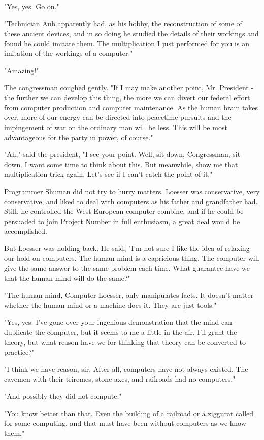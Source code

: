\documentclass{amsart}
\begin{document}
"Yes, yes. Go on."

"Technician Aub apparently had, as his hobby, the reconstruction of
some of these ancient devices, and in so doing he studied the details
of their workings and found he could imitate them. The multiplication
I just performed for you is an imitation of the workings of a
computer."

"Amazing!"

The congressman coughed gently. "If I may make another point, Mr.
President - the further we can develop this thing, the more we can
divert our federal effort from computer production and computer
maintenance. As the human brain takes over, more of our energy can be
directed into peacetime pursuits and the impingement of war on the
ordinary man will be less. This will be most advantageous for the
party in power, of course."

"Ah," said the president, "I see your point. Well, sit down,
Congressman, sit down. I want some time to think about this. But
meanwhile, show me that multiplication trick again. Let's see if I
can't catch the point of it."

Programmer Shuman did not try to hurry matters. Loesser was
conservative, very conservative, and liked to deal with computers as
his father and grandfather had. Still, he controlled the West European
computer combine, and if he could be persuaded to join Project Number
in full enthusiasm, a great deal would be accomplished.

But Loesser was holding back. He said, "I'm not sure I like the idea
of relaxing our hold on computers. The human mind is a capricious
thing. The computer will give the same answer to the same problem each
time. What guarantee have we that the human mind will do the same?"

"The human mind, Computer Loesser, only manipulates facts. It doesn't
matter whether the human mind or a machine does it. They are just
tools."

"Yes, yes. I've gone over your ingenious demonstration that the mind
can duplicate the computer, but it seems to me a little in the air.
I'll grant the theory, but what reason have we for thinking that
theory can be converted to practice?"

"I think we have reason, sir. After all, computers have not always
existed. The cavemen with their triremes, stone axes, and railroads
had no computers."

"And possibly they did not compute."

"You know better than that. Even the building of a railroad or a
ziggurat called for some computing, and that must have been without
computers as we know them."
\end{document}
